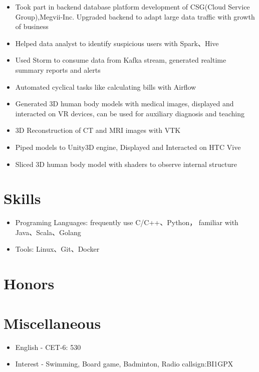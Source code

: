 \documentclass{resume}
\begin{document}
\begin{itemize}[topsep = 0 pt, partopsep = 0pt]
  \item Took part in backend database platform development of CSG(Cloud Service Group),Megvii-Inc. Upgraded backend to adapt large data traffic with growth of business
  \item Helped data analyst to identify suspicious users with Spark、Hive
  \item Used Storm to consume data from Kafka stream, generated realtime summary reports and alerts
  \item Automated cyclical tasks like calculating bills with Airflow 
\end{itemize}

\begin{itemize}[topsep = 0 pt, partopsep = 0pt]
  \item Generated 3D human body models with medical images, displayed and interacted on VR devices, can be used for auxiliary diagnosis and teaching
  \item 3D Reconstruction of CT and MRI images with VTK
  \item Piped models to Unity3D engine, Displayed and Interacted on HTC Vive
  \item Sliced 3D human body model with shaders to observe internal structure
\end{itemize}

\section{Skills}
\begin{itemize}[parsep=0.5ex]
  \item Programing Languages: frequently use  C/C++、Python， familiar with  Java、Scala、Golang
  \item Tools: Linux、Git、Docker
\end{itemize}

\section{Honors}

\section{Miscellaneous}
\begin{itemize}[parsep=0.5ex]
  \item  English - CET-6: 530
  \item  Interest - Swimming, Board game, Badminton, Radio callsign:BI1GPX
\end{itemize}
\end{document}
